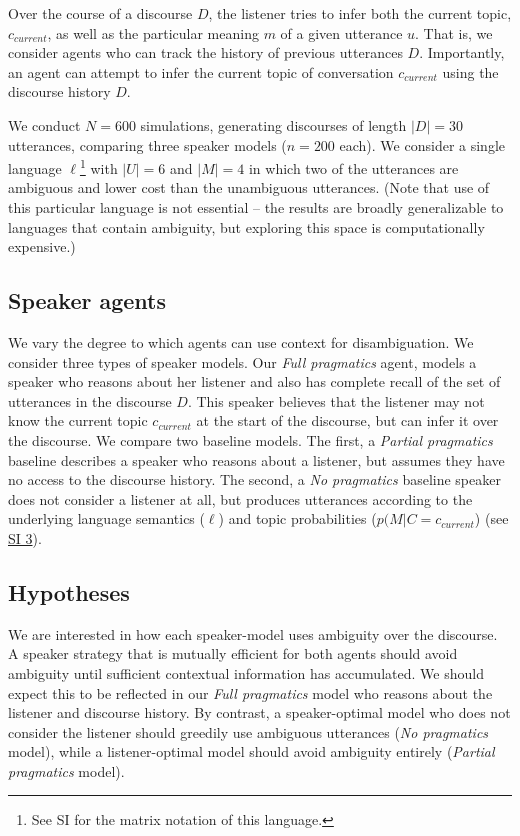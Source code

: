\documentclass[10pt, letterpaper]{article}
\begin{document}
Over the course of a discourse \(D\), the listener tries to infer both
the current topic, \(c_{current}\), as well as the particular meaning
\(m\) of a given utterance \(u\). That is, we consider agents who can
track the history of previous utterances \(D\). Importantly, an agent
can attempt to infer the current topic of conversation \(c_{current}\)
using the discourse history \(D\).\par

We conduct \(N=600\) simulations, generating discourses of length
\(|D|=30\) utterances, comparing three speaker models (\(n=200\) each).
We consider a single language
\(\ell\)\footnote{See SI for the matrix notation of this language.} with
\(|U|=6\) and \(|M|=4\) in which two of the utterances are ambiguous and
lower cost than the unambiguous utterances. (Note that use of this
particular language is not essential -- the results are broadly
generalizable to languages that contain ambiguity, but exploring this
space is computationally expensive.)\par

\subsection{Speaker agents}\label{speaker-agents}

We vary the degree to which agents can use context for disambiguation.
We consider three types of speaker models. Our \textit{Full pragmatics}
agent, models a speaker who reasons about her listener and also has
complete recall of the set of utterances in the discourse \(D\). This
speaker believes that the listener may not know the current topic
\(c_{current}\) at the start of the discourse, but can infer it over the
discourse. We compare two baseline models. The first, a
\textit{Partial pragmatics} baseline describes a speaker who reasons
about a listener, but assumes they have no access to the discourse
history. The second, a \textit{No pragmatics} baseline speaker does not
consider a listener at all, but produces utterances according to the
underlying language semantics (\(\ell\)) and topic probabilities
(\(p(M|C=c_{current}\)) (see \href{https://bit.ly/2RBSGcU}{SI 3}).\par

\subsection{Hypotheses}\label{hypotheses}

We are interested in how each speaker-model uses ambiguity over the
discourse. A speaker strategy that is mutually efficient for both agents
should avoid ambiguity until sufficient contextual information has
accumulated. We should expect this to be reflected in our
\textit{Full pragmatics} model who reasons about the listener and
discourse history. By contrast, a speaker-optimal model who does not
consider the listener should greedily use ambiguous utterances
(\textit{No pragmatics} model), while a listener-optimal model should
avoid ambiguity entirely (\textit{Partial pragmatics} model).\par
\end{document}
